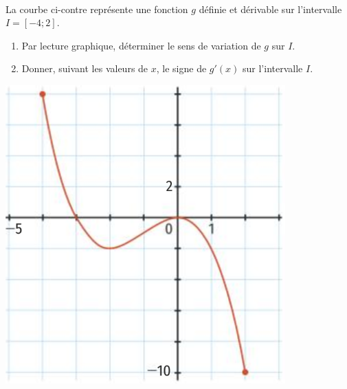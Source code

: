 \documentclass[11pt]{article}
\begin{document}
\begin{exo}~\\[-2mm]
\begin{minipage}{.6\textwidth}
  La courbe ci-contre représente une fonction $g$ définie et dérivable sur
  l'intervalle $I=[-4;2]$.
  \begin{enumerate}
    \item Par lecture graphique, déterminer le sens de variation de $g$ sur $I$.
    \item Donner, suivant les valeurs de $x$, le signe de $g'(x)$ sur
      l'intervalle $I$.
  \end{enumerate}
\end{minipage}
\begin{minipage}{.4\textwidth}
  \begin{center}
    \includegraphics[scale=.25]{exo2.png}
  \end{center}
\end{minipage}
\end{exo}
\end{document}
